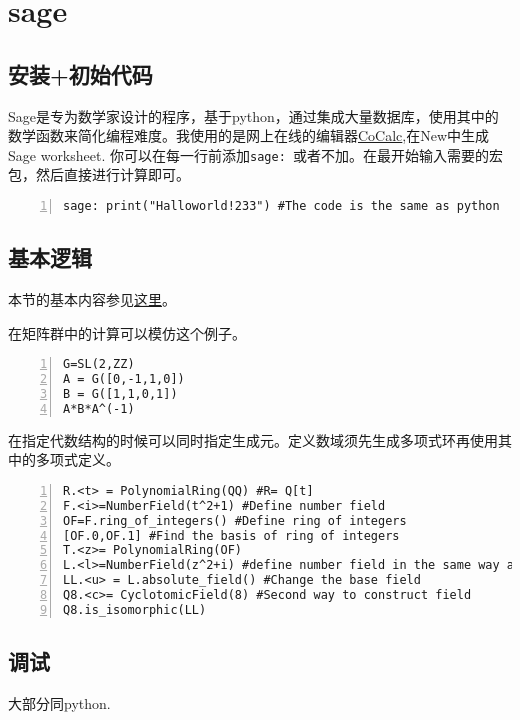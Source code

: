\documentclass[11pt]{amsart}
\begin{document}
\begin{lstlisting}[language=iPython]
\end{lstlisting}


\section{sage}
\subsection{安装+初始代码}
Sage是专为数学家设计的程序，基于python，通过集成大量数据库，使用其中的数学函数来简化编程难度。我使用的是网上在线的编辑器\href{https://cocalc.com/projects}{CoCalc},在New中生成Sage worksheet.
你可以在每一行前添加\lstinline|sage: |或者不加。在最开始输入需要的宏包，然后直接进行计算即可。

\begin{lstlisting}[numbers=left,numberstyle=\tiny,numbersep=10pt]
sage: print("Halloworld!233") #The code is the same as python
\end{lstlisting}
\subsection{基本逻辑}
本节的基本内容参见\href{https://www.osgeo.cn/sagemath/thematic_tutorials/tutorial-programming-python.html#tutorial-programming-python}{这里}。

在矩阵群中的计算可以模仿这个例子。
\begin{lstlisting}[numbers=left,numberstyle=\tiny,numbersep=10pt]
G=SL(2,ZZ)
A = G([0,-1,1,0])
B = G([1,1,0,1])
A*B*A^(-1)
\end{lstlisting}

在指定代数结构的时候可以同时指定生成元。定义数域须先生成多项式环再使用其中的多项式定义。
\begin{lstlisting}[numbers=left,numberstyle=\tiny,numbersep=10pt]
R.<t> = PolynomialRing(QQ) #R= Q[t]
F.<i>=NumberField(t^2+1) #Define number field
OF=F.ring_of_integers() #Define ring of integers
[OF.0,OF.1] #Find the basis of ring of integers
T.<z>= PolynomialRing(OF)
L.<l>=NumberField(z^2+i) #define number field in the same way again
LL.<u> = L.absolute_field() #Change the base field
Q8.<c>= CyclotomicField(8) #Second way to construct field
Q8.is_isomorphic(LL)
\end{lstlisting}

\subsection{调试}
大部分同python.
\end{document}
